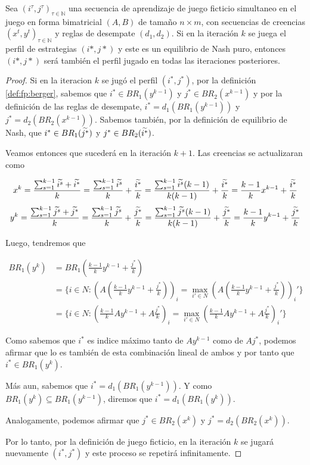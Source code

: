 \begin{theorem}
    Sea $(i^\tau, j^\tau)_{\tau \in \mathbb{N}}$ una secuencia de aprendizaje de juego ficticio simultaneo en el juego en forma bimatricial $(A, B)$ de tamaño $n \times m$, con secuencias de creencias $(x^t, y^t)_{\tau \in \mathbb{N}}$ y reglas de desempate $(d_1, d_2)$. Si en la iteración $k$ se juega el perfil de estrategias $(i*, j*)$ y este es un equilibrio de Nash puro, entonces $(i*, j*)$ será también el perfil jugado en todas las iteraciones posteriores.
\end{theorem}

\begin{proof}
    Si en la iteracion $k$ se jugó el perfil $(i^*, j^*)$, por la definición \ref{def:fp:berger}, sabemos que $i^* \in BR_1(y^{k-1})$ y $j^* \in BR_2(x^{k-1})$ y por la definición de las reglas de desempate, $i^* = d_1(BR_1(y^{k-1}))$ y $j^* = d_2(BR_2(x^{k-1}))$. Sabemos también, por la definición de equilibrio de Nash, que $i^* \in BR_1(\widetilde{j^*})$ y $j^* \in BR_2(\widetilde{i^*})$.

    Veamos entonces que sucederá en la iteración $k+1$. Las creencias se actualizaran como

    \[
        x^k = \frac{\sum_{s=1}^{k-1}{\widetilde{i^s}} + \widetilde{i^*}}{k}
            = \frac{\sum_{s=1}^{k-1}{\widetilde{i^s}}}{k} + \frac{\widetilde{i^*}}{k}
            = \frac{\sum_{s=1}^{k-1}{\widetilde{i^s}}(k-1)}{k(k-1)} + \frac{\widetilde{i^*}}{k}
            = \frac{k - 1}{k} x^{k-1} + \frac{\widetilde{i^*}}{k}
    \]
    \[
        y^k = \frac{\sum_{s=1}^{k-1}{\widetilde{j^s}} + \widetilde{j^*}}{k}
            = \frac{\sum_{s=1}^{k-1}{\widetilde{j^s}}}{k} + \frac{\widetilde{j^*}}{k}
            = \frac{\sum_{s=1}^{k-1}{\widetilde{j^s}}(k-1)}{k(k-1)} + \frac{\widetilde{j^*}}{k}
            = \frac{k - 1}{k} y^{k-1} + \frac{\widetilde{j^*}}{k}
    \]

    Luego, tendremos que

    \begin{align*}
        BR_1(y^k) &= BR_1(\frac{k - 1}{k} y^{k-1} + \frac{j^*}{k}) \\
        &= \{i \in N : (A(\frac{k - 1}{k} y^{k-1} + \frac{j^*}{k}))_i = \max_{i' \in N} (A(\frac{k - 1}{k} y^{k-1} + \frac{j^*}{k}))_i'\}\\
        &= \{i \in N : (\frac{k - 1}{k} Ay^{k-1} + A\frac{j^*}{k})_i = \max_{i' \in N} (\frac{k - 1}{k} Ay^{k-1} + A\frac{j^*}{k})_i'\}
    \end{align*}

    Como sabemos que $i^*$ es indice máximo tanto de $Ay^{k-1}$ como de $Aj^*$, podemos afirmar que lo es también de esta combinación lineal de ambos y por tanto que $i^* \in BR_1(y^k)$. 
    
    Más aun, sabemos que $i^* = d_1(BR_1(y^{k-1}))$. Y como $BR_1(y^{k}) \subseteq BR_1(y^{k-1})$, diremos que $i^* = d_1(BR_1(y^{k}))$.
    
    Analogamente, podemos afirmar que $j^* \in BR_2(x^k)$ y $j^* = d_2(BR_2(x^k))$.
    
    Por lo tanto, por la definición de juego ficticio, en la iteración $k$ se jugará nuevamente $(i^*, j^*)$ y este proceso se repetirá infinitamente.

\end{proof}

